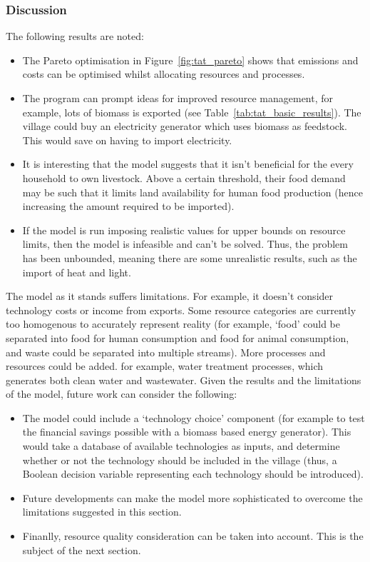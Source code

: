 \subsubsection*{Discussion}
The following results are noted:
\begin{itemize}
	\item The Pareto optimisation in Figure~\ref{fig:tat_pareto} shows that emissions and costs can be optimised whilst allocating resources and processes.
	\item The program can prompt ideas for improved resource management, for example, lots of biomass is exported (see Table~\ref{tab:tat_basic_results}). The village could buy an electricity generator which uses biomass as feedstock. This would save on having to import electricity.
	\item It is interesting that the model suggests that it isn't beneficial for the every household to own livestock. Above a certain threshold, their food demand may be such that it limits land availability for human food production (hence increasing the amount required to be imported).
	\item If the model is run imposing realistic values for upper bounds on resource limits, then the model is infeasible and can't be solved. Thus, the problem has been unbounded, meaning there are some unrealistic results, such as the import of heat and light. 
\end{itemize}	
The model as it stands suffers limitations. For example, it doesn't consider technology costs or income from exports. Some resource categories are currently too homogenous to accurately represent reality (for example, `food' could be separated into food for human consumption and food for animal consumption, and waste could be separated into multiple streams). More processes and resources could be added. for example, water treatment processes, which generates both clean water and wastewater. Given the results and the limitations of the model, future work can consider the following:
\begin{itemize}
	\item The model could include a `technology choice' component (for example to test the financial savings possible with a biomass based energy generator). This would take a database of available technologies as inputs, and determine whether or not the technology should be included in the village (thus, a Boolean decision variable representing each technology should be introduced).
	\item Future developments can make the model more sophisticated to overcome the limitations suggested in this section.
	\item Finanlly, resource quality consideration can be taken into account. This is the subject of the next section.
\end{itemize}

